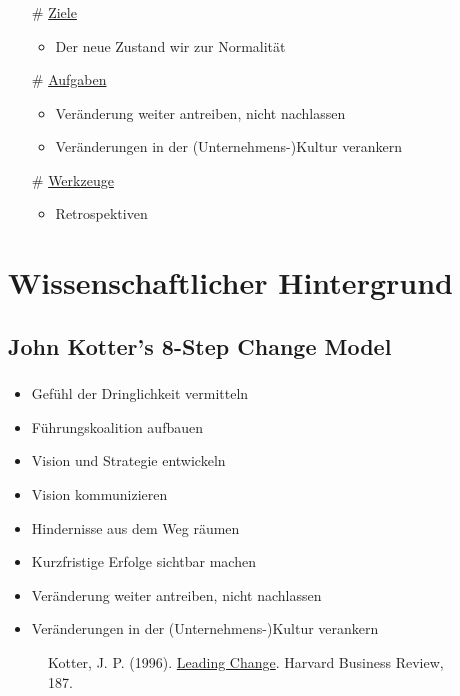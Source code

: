\documentclass[aspectratio=169]{beamer}
\begin{document}
\begin{frame}
\frametitle{\subsecname}\framesubtitle{\secname}
\begin{itemize}
\setlength\itemsep{1em}
\item[\selectfont\textcolor{ipt-blue}{\#}]\underline{Ziele}
\begin{itemize}
  \item Der neue Zustand wir zur Normalität
\end{itemize}
\item[\selectfont\textcolor{ipt-blue}{\#}]\underline{Aufgaben}
\begin{itemize}
\item Veränderung weiter antreiben, nicht nachlassen
\item Veränderungen in der (Unternehmens-)Kultur verankern
\end{itemize}
\item[\selectfont\textcolor{ipt-blue}{\#}]\underline{Werkzeuge}
\begin{itemize}
  \item Retrospektiven
\end{itemize}
\end{itemize}
\end{frame}


\section{Wissenschaftlicher Hintergrund}
\subsection{John Kotter’s 8-Step Change Model}
\begin{frame}
\frametitle{\subsecname}\framesubtitle{\secname}
\begin{itemize}[label={$\bullet$}]
\item Gefühl der Dringlichkeit vermitteln
\item Führungskoalition aufbauen
\item Vision und Strategie entwickeln
\item Vision kommunizieren
\item Hindernisse aus dem Weg räumen
\item Kurzfristige Erfolge sichtbar machen
\item Veränderung weiter antreiben, nicht nachlassen
\item Veränderungen in der (Unternehmens-)Kultur verankern
\end{itemize}
\mbox{}
\vfill
\begin{figure}[!b]
    Kotter, J. P. (1996). \href{http://doi.org/10.1007/s13398-014-0173-7.2}{Leading Change}. Harvard Business Review, 187.
\end{figure}

\end{frame}
\end{document}
